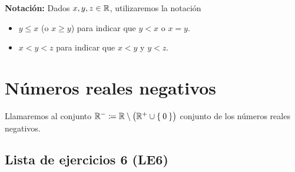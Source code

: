 \textbf{Notación:} Dados $x,y,z\in \mathbb{R}$, utilizaremos la notación \begin{itemize}
 \item $y \leq x$ (o $x\geq y$) para indicar que $y<x$ o $x=y$.
 \item $x<y<z$ para indicar que $x<y$ y $y<z$.
\end{itemize}
%


\section*{Números reales negativos}

 Llamaremos al conjunto $\mathbb{R}^-\coloneqq \mathbb{R}\setminus\bigl(\mathbb{R}^+\cup \Set{0}\bigr)$ conjunto de los números reales negativos.

\subsection*{Lista de ejercicios 6 (LE6)}

